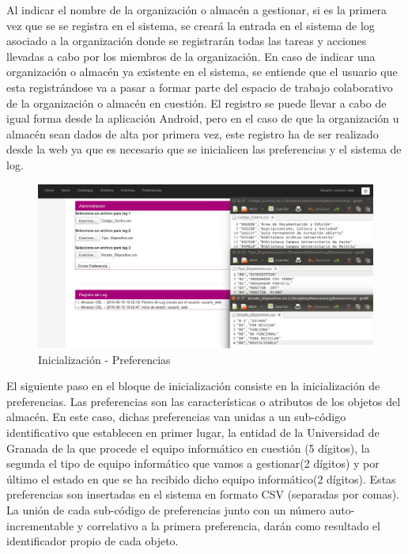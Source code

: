 \documentclass[a4paper,11pt]{book}
\begin{document}
Al indicar el nombre de la organización o almacén a gestionar, si es la primera vez que se se registra en el sistema, se creará la entrada en el sistema de log asociado  a la organización donde se registrarán todas las tareas y acciones llevadas a cabo por los miembros de la organización. En caso de indicar una organización o almacén ya existente en el sistema, se entiende que el usuario que esta registrándose va a pasar a formar parte del espacio de trabajo colaborativo de la organización o almacén en cuestión. El registro se puede llevar a cabo de igual forma desde la aplicación Android, pero en el caso de que la organización u almacén sean dados de alta por primera vez, este registro ha de ser realizado desde la web ya que es necesario que se inicialicen las preferencias y el sistema de log.

\begin{figure}[H] 
\centering 
\includegraphics[scale=0.3]{imagenes/pruebas/preferencias.png}
\caption{ Inicialización - Preferencias\cite{propio}}
\end{figure}

El siguiente paso en el bloque de inicialización consiste en la inicialización de preferencias. Las preferencias son las características o atributos de los objetos del almacén. En este caso, dichas preferencias van unidas a un sub-código identificativo que establecen en primer lugar, la entidad de la Universidad de Granada de la que procede el equipo informático en cuestión (5 dígitos), la segunda el tipo de equipo informático que vamos a gestionar(2 dígitos) y por último el estado en que se ha recibido dicho equipo informático(2 dígitos). Estas preferencias son insertadas en el sistema en formato CSV (separadas por comas). La unión de cada sub-código de preferencias junto con un número auto-incrementable y correlativo a  la primera preferencia, darán como resultado el identificador propio de cada objeto. 
\end{document}
